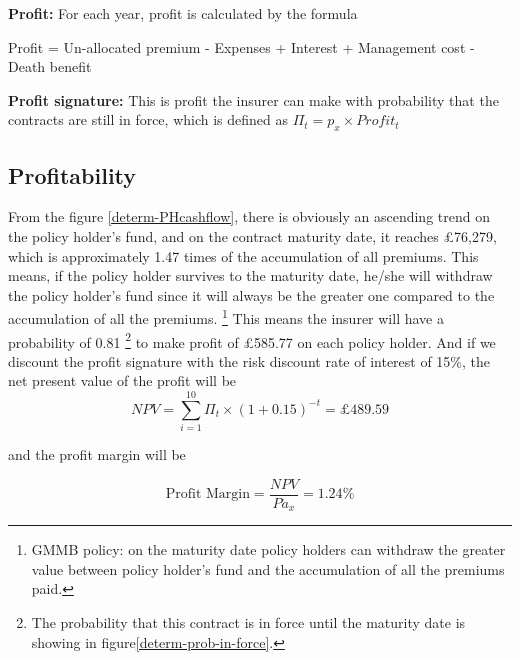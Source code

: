\documentclass{report}
\begin{document}
\textbf{Profit:} For each year, profit is calculated by the formula

Profit = Un-allocated premium - Expenses + Interest + Management cost - Death benefit

\textbf{Profit signature:} This is profit the insurer can make with probability that the contracts are still in force, which is defined as $\Pi_t = p_x \times Profit_t$


\subsection{Profitability}


From the figure \ref{determ-PHcashflow}, there is obviously an ascending trend on the policy holder's fund, and on the contract maturity date, it reaches \pounds 76,279, which is approximately 1.47 times of the accumulation of all premiums. This means, if the policy holder survives to the maturity date, he/she will withdraw the policy holder's fund since it will always be the greater one compared to the accumulation of all the premiums. \footnote{GMMB policy: on the maturity date policy holders can withdraw the greater value between policy holder's fund and the accumulation of all the premiums paid.} This means the insurer will have a probability of 0.81 \footnote{The probability that this contract is in force until the maturity date is showing in figure\ref{determ-prob-in-force}.} to make profit of \pounds 585.77 on each policy holder. And if we discount the profit signature with the risk discount rate of interest of 15\%, the net present value of the profit will be 
\[
 NPV=\sum_{i=1}^{10} \Pi_t \times (1+0.15)^{-t} = \pounds 489.59
\]
 
and the profit margin will be


\[
\text{Profit\ Margin} =  \frac{NPV}{P \ddot{a}_x} = 1.24\%
\]
\end{document}

